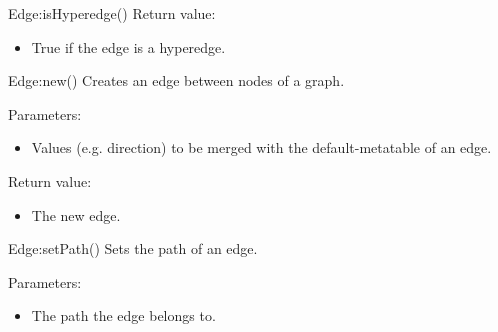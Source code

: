 \begin{luacommand}{{Edge:isHyperedge}()}
Return value:
\begin{itemize} \item[] True if the edge is a hyperedge. \end{itemize}


\end{luacommand}\begin{luacommand}{{Edge:new}()}
Creates an edge between nodes of a graph.

Parameters:
\begin{itemize}
	\item[]  \subitem Values (e.g. direction) to be merged with the default-metatable of an edge.
\end{itemize}


Return value:
\begin{itemize} \item[] The new edge. \end{itemize}


\end{luacommand}\begin{luacommand}{{Edge:setPath}()}
Sets the path of an edge.

Parameters:
\begin{itemize}
	\item[]  \subitem The path the edge belongs to.
\end{itemize}



\end{luacommand}
